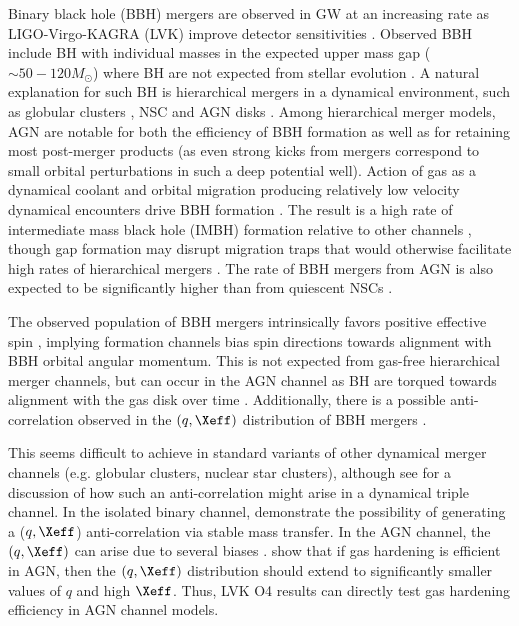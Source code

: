 Binary black hole (BBH) mergers are observed in GW at an increasing rate as LIGO-Virgo-KAGRA (LVK) improve detector sensitivities \citep[e.g.][ see also \footnote{https://gracedb.ligo.org/superevents/public/O4/}]{Abbott+20-GW190521astro}.
Observed BBH include BH with individual masses in the expected upper mass gap ($\sim 50-120M_{\odot}$) where BH are not expected from stellar evolution \citep{Belcynzski+16,RenzoSmith24}.
A natural explanation for such BH is hierarchical mergers in a dynamical environment, such as globular clusters \citep{Rodriguez+18}, NSC \citep{Antonini&Rasio16,Hoang+18,Fragione+19} and AGN disks \citep{McKernan+14,Bartos+17,StoneMetzgerHaiman17, ArcaSedda23,FordMcKernan25}.
Among hierarchical merger models, AGN are notable for both the efficiency of BBH formation as well as for retaining most post-merger products (as even strong kicks from mergers correspond to small orbital perturbations in such a deep potential well).
Action of gas as a dynamical coolant and orbital migration producing relatively low velocity dynamical encounters drive BBH formation \citep[e.g.][]{Rowan+23,QianLiLai24,DodiciTremaine24}.
The result is a high rate of intermediate mass black hole (IMBH) formation relative to other channels \citep{McKernan+12,Bellovary+16,Secunda+21,Yang+19,McKernan+20a,TagawaHaimanKocsis20,Vaccaro+24}, though gap formation may disrupt migration traps that would otherwise facilitate high rates of hierarchical mergers \citep{Gilbaum+25}.
The rate of BBH mergers from AGN is also expected to be significantly higher than from quiescent NSCs \citep{FordMcKernan22}.

The observed population of BBH mergers intrinsically favors positive effective spin \citep{Abbott+23-O3b}, implying formation channels bias spin directions towards alignment with BBH orbital angular momentum.
This is not expected from gas-free hierarchical merger channels, but can occur in the AGN channel as BH are torqued towards alignment with the gas disk over time \citep{Tagawa+20spin,Vajpeyi+22,McKernanFord24}.
Additionally, there is a possible anti-correlation observed in the $(q,\Xeff)$ distribution of BBH mergers \citep{Callister+21}.

This seems difficult to achieve in standard variants of other dynamical merger channels (e.g.
globular clusters, nuclear star clusters), although see \citep{Su25} for a discussion of how such an anti-correlation might arise in a dynamical triple channel.
In the isolated binary channel, \citep[e.g.][]{Olejak+24,BanerjeeOlejak24} demonstrate the possibility of generating a ($q,\Xeff$) anti-correlation via stable mass transfer.
In the AGN channel, the $(q,\Xeff)$ can arise due to several biases \citep{Mckernan+22:q-Xeff,Santini+23, DittmannDempseyLi24}.
\citet{Vaccaro+24} show that if gas hardening is efficient in AGN, then the $(q,\Xeff)$ distribution should extend to significantly smaller values of $q$ and high $\Xeff$.
Thus, LVK O4 results can directly test gas hardening efficiency in AGN channel models.

